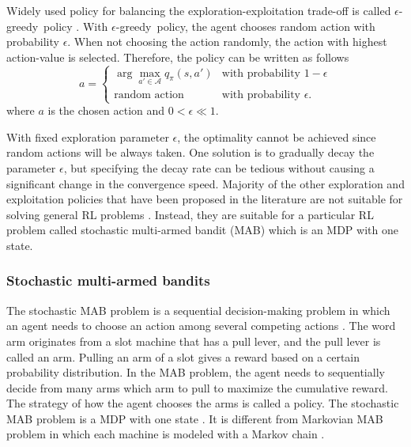 \documentclass[english, 12pt, a4paper, elec, utf8, a-1b, online]{aaltothesis}
\newcommand{\As}{\mathcal{A}}
\newcommand{\egreedy}{$\epsilon$-greedy~}
\begin{document}
Widely used policy for balancing the exploration-exploitation trade-off is called \egreedy policy \cite{Sutton2018}.
With \egreedy policy, the agent chooses random action with probability $\epsilon$.
When not choosing the action randomly, the action with highest action-value is selected.
Therefore, the policy can be written as follows
\begin{equation}\label{eq:epsilon_greedy}
    a =
    \left\{
        \begin{array}{ll}
            \arg\max_{a' \in \As} q_\pi(s, a') & \text{with probability $1-\epsilon$}\\
            \text{random action} & \text{with probability $\epsilon$}.
        \end{array}
    \right.
\end{equation}
where $a$ is the chosen action and $0 < \epsilon \ll 1$.

With fixed exploration parameter $\epsilon$, the optimality cannot be achieved since random actions will be always taken.
One solution is to gradually decay the parameter $\epsilon$, but specifying the decay rate can be tedious without causing a significant change in the convergence speed.
Majority of the other exploration and exploitation policies that have been proposed in the literature are not suitable for solving general RL problems \cite{Slivkins2019}.
Instead, they are suitable for a particular RL problem called stochastic multi-armed bandit (MAB) which is an MDP with one state.

\subsubsection{Stochastic multi-armed bandits}\label{sec:MAB}

The stochastic MAB problem is a sequential decision-making problem in which an agent needs to choose an action among several competing actions \cite{Sutton2018}.
The word arm originates from a slot machine that has a pull lever, and the pull lever is called an arm.
Pulling an arm of a slot gives a reward based on a certain probability distribution.
In the MAB problem, the agent needs to sequentially decide from many arms which arm to pull to maximize the cumulative reward.
The strategy of how the agent chooses the arms is called a policy.
The stochastic MAB problem is a MDP with one state \cite{Sutton2018}.
It is different from Markovian MAB problem in which each machine is modeled with a Markov chain \cite{Katehakis1987}.
\end{document}

